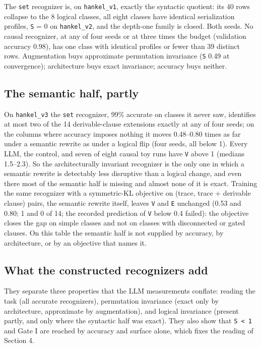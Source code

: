 The \texttt{set} recognizer is, on \texttt{hankel\_v1}, exactly the
syntactic quotient: its 40 rows collapse to the 8 logical classes, all
eight classes have identical serialization profiles, \texttt{S} = 0 on
\texttt{hankel\_v2}, and the depth-one family is closed. Both seeds. No
causal recognizer, at any of four seeds or at three times the budget
(validation accuracy 0.98), has one class with identical profiles or
fewer than 39 distinct rows. Augmentation buys approximate permutation
invariance (\texttt{S} 0.49 at convergence); architecture buys exact
invariance; accuracy buys neither.

\hypertarget{the-semantic-half-partly}{%
\subsection{The semantic half,
partly}\label{the-semantic-half-partly}}

On \texttt{hankel\_v3} the \texttt{set} recognizer, 99\% accurate on
classes it never saw, identifies at most two of the 14 derivable-clause
extensions exactly at any of four seeds; on the columns where accuracy
imposes nothing it moves 0.48--0.80 times as far under a semantic
rewrite as under a logical flip (four seeds, all below 1). Every LLM, the
control, and seven of eight causal toy runs have \texttt{V} above 1
(medians 1.5--2.3). So the architecturally invariant recognizer is the
only one in which a semantic rewrite is detectably less disruptive than a
logical change, and even there most of the semantic half is missing and
almost none of it is exact. Training the same recognizer with a
symmetric-KL objective on (trace, trace + derivable clause) pairs, the
semantic rewrite itself, leaves \texttt{V} and \texttt{E} unchanged
(0.53 and 0.80; 1 and 0 of 14; the recorded prediction of \texttt{V}
below 0.4 failed): the objective closes the gap on simple classes and not
on classes with disconnected or gated clauses. On this table the semantic
half is not supplied by accuracy, by architecture, or by an objective that
names it.

\hypertarget{what-the-constructed-recognizers-add}{%
\subsection{What the constructed recognizers
add}\label{what-the-constructed-recognizers-add}}

They separate three properties that the LLM measurements conflate:
reading the task (all accurate recognizers), permutation invariance
(exact only by architecture, approximate by augmentation), and logical
invariance (present partly, and only where the syntactic half was
exact). They also show that \texttt{S\ \textless{}\ 1} and Gate I are
reached by accuracy and surface alone, which fixes the reading of
Section 4.

